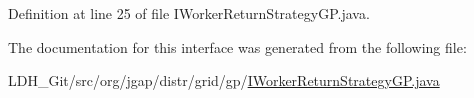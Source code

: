 Definition at line 25 of file I\-Worker\-Return\-Strategy\-G\-P.\-java.



The documentation for this interface was generated from the following file\-:\begin{DoxyCompactItemize}
\item 
L\-D\-H\-\_\-\-Git/src/org/jgap/distr/grid/gp/\hyperlink{_i_worker_return_strategy_g_p_8java}{I\-Worker\-Return\-Strategy\-G\-P.\-java}\end{DoxyCompactItemize}
